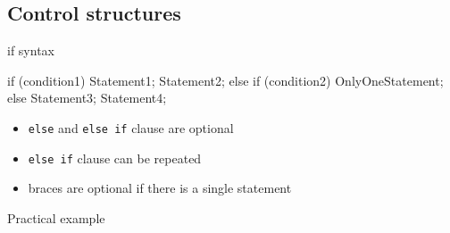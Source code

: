 \subsection[Control]{Control structures}

\begin{frame}[fragile]
  \begin{block}{if syntax}
    \begin{cppcode*}{}
      if (condition1) {
        Statement1; Statement2;
      } else if (condition2)
        OnlyOneStatement;
      else {
        Statement3;
        Statement4;
      }
    \end{cppcode*}
    \begin{itemize}
      \item \texttt{else} and \texttt{else if} clause are optional
      \item \texttt{else if} clause can be repeated
      \item braces are optional if there is a single statement
    \end{itemize}
  \end{block}
\end{frame}

\begin{frame}[fragile]
  \begin{exampleblock}{Practical example}
  \end{exampleblock}
\end{frame}

